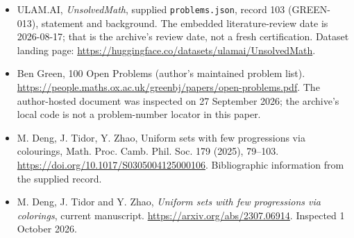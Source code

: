 \documentclass[11pt,a4paper]{article}
\begin{document}
{\small

\begin{itemize}

\item[\hypertarget{source:103:1}{S1}] ULAM.AI, \emph{UnsolvedMath}, supplied \texttt{problems.json}, record 103 (GREEN-013), statement and background. The embedded literature-review date is 2026-08-17; that is the archive’s review date, not a fresh certification. Dataset landing page: \url{https://huggingface.co/datasets/ulamai/UnsolvedMath}.

\item[\hypertarget{source:103:2}{S2}] Ben Green, 100 Open Problems (author’s maintained problem list). \url{https://people.maths.ox.ac.uk/greenbj/papers/open-problems.pdf}. The author-hosted document was inspected on 27 September 2026; the archive’s local code is not a problem-number locator in this paper.

\item[\hypertarget{source:103:3}{S3}] M. Deng, J. Tidor, Y. Zhao, Uniform sets with few progressions via colourings, Math. Proc. Camb. Phil. Soc. 179 (2025), 79--103. \url{https://doi.org/10.1017/S0305004125000106}. Bibliographic information from the supplied record.

\item[E1] M. Deng, J. Tidor and Y. Zhao, \emph{Uniform sets with few progressions via colorings}, current manuscript. \url{https://arxiv.org/abs/2307.06914}. Inspected 1 October 2026.

\end{itemize}

}

\label{end:103}
\end{document}
